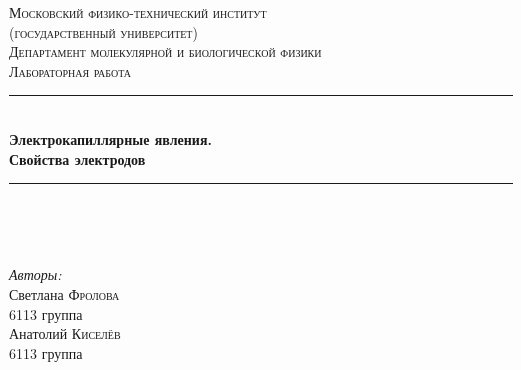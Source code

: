 \documentclass[a4paper, 12pt]{article}
\begin{document}
\begin{titlepage}

\newcommand{\HRule}{\rule{\linewidth}{0.5mm}} %

\center %
 

\textsc{\LARGE Московский физико-технический институт\\(государственный университет)}\\[1,5cm] %
\textsc{\Large Департамент молекулярной и биологической физики}\\[2cm] %
\textsc{\large Лабораторная работа}\\[0.5cm] %


\HRule
\\[0.2cm]
{ \huge \bfseries Электрокапиллярные явления.\\Свойства электродов}
\\[0.2cm] %
\HRule
\\[1.5cm]


 
\begin{minipage}{0.4\textwidth}
	\begin{flushleft}		
	\end{flushleft}
\end{minipage}
~
\begin{minipage}{0.4\textwidth}
	\begin{flushright} \large
		\emph{Авторы:}\\
		Светлана \textsc{Фролова} \\
		6113 группа \\
		Анатолий \textsc{Киселёв} \\
		6113 группа
	\end{flushright}
\end{minipage}



\end{titlepage}
\end{document}
